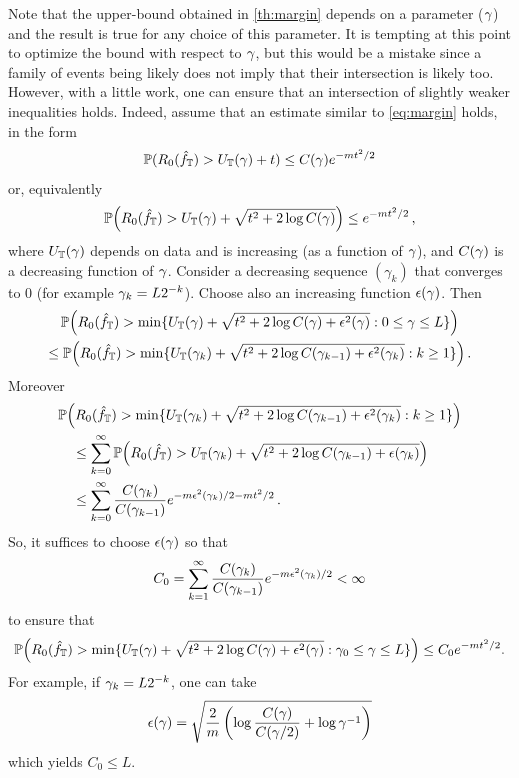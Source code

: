 \begin{remark}
\label{rem:multiple.bounds}
Note that the upper-bound obtained in  \cref{th:margin} depends on a parameter ($\gamma$) and the result is true for any choice of this parameter. It is tempting at this point to optimize the bound with respect to $\gamma$, but this would be a mistake since a family of events being likely does not imply that their intersection is likely too. However, with a little work, one can ensure that an intersection of slightly weaker inequalities holds. Indeed, assume that an estimate similar to \cref{eq:margin} holds, in the form
\[
\bm{\mathbb P}(R_0({\hat{f}}_{\mathbb T}) > U_{\mathbb T}(\gamma) + t) \leq C(\gamma) e^{-mt^2/2}
\]
or, equivalently
\[
\bm{\mathbb P}\Big(R_0({\hat{f}}_{\mathbb T}) > U_{\mathbb T}(\gamma) + \sqrt{t^2 + 2\log C(\gamma)}\Big) \leq e^{-mt^2/2}\,,
\]
where $U_{\mathbb T}(\gamma)$ depends on data and is increasing (as a function of $\gamma$), and $C(\gamma)$ is a decreasing function of $\gamma$. Consider a decreasing sequence $(\gamma_k)$ that converges to 0 (for example $\gamma_k = L2^{-k}$). Choose also an increasing function $\epsilon(\gamma)$. Then
\begin{multline*}
\bm{\mathbb P}\Big(R_0({\hat{f}}_{\mathbb T}) > \min\{U_{\mathbb T}(\gamma) + \sqrt{t^2+ 2\log C(\gamma)+ \epsilon^2(\gamma)}: 0 \leq \gamma \leq L\}\Big)\\
 \leq 
\bm{\mathbb P}\Big(R_0({\hat{f}}_{\mathbb T}) > \min\{U_{\mathbb T}(\gamma_k) + \sqrt{t^2+ 2\log C(\gamma_{k-1}) + \epsilon^2(\gamma_k)}: k\geq 1\}\Big)\,.
\end{multline*}
Moreover
\begin{align*}
&\bm{\mathbb P}\Big(R_0({\hat{f}}_{\mathbb T}) > \min\{U_{\mathbb T}(\gamma_k) + \sqrt{t^2+  2\log C(\gamma_{k-1}) + \epsilon^2(\gamma_k)}: k\geq 1\}\Big) \\
&\quad \leq \sum_{k=0}^\infty \bm{\mathbb P}\Big(R_0({\hat{f}}_{\mathbb T}) >  U_{\mathbb T}(\gamma_k) + \sqrt{t^2+  2\log C(\gamma_{k-1}) + \epsilon(\gamma_k)}\Big)\\
&\quad \leq \sum_{k=0}^\infty \frac{C(\gamma_k)}{C(\gamma_{k-1})}  e^{-m\epsilon^2(\gamma_k)/2 - mt^2/2}\,.
\end{align*}
So, it suffices to choose $\epsilon(\gamma)$ so that
\[
C_0 = \sum_{k=1}^\infty \frac{C(\gamma_k)}{C(\gamma_{k-1})} e^{-m\epsilon^2(\gamma_k)/2} < \infty
\]
to ensure that
\[
\bm{\mathbb P}\Big(R_0({\hat{f}}_{\mathbb T}) > \min\{U_{\mathbb T}(\gamma) + \sqrt{t^2+ 2\log C(\gamma)+\epsilon^2(\gamma)}: \gamma_0 \leq \gamma \leq L\}\Big) \leq C_0 e^{-mt^2/2}.
\]
For example, if $\gamma_k = L2^{-k}$, one can take 
\[
\epsilon(\gamma) = \sqrt{\frac{2}{m} \left(\log\frac{C(\gamma)}{C(\gamma/2)} + \log \gamma^{-1}\right)}
\]
which yields $C_0 \leq L$. 
\end{remark}



